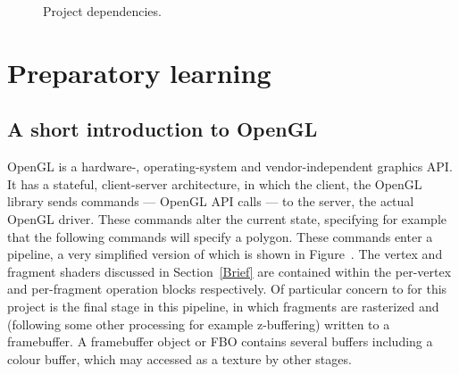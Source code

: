 \documentclass[12pt,twoside,notitlepage]{report}
\begin{document}
\begin{figure}
\caption{Project dependencies.\label{depend}}
\end{figure}

\section{Preparatory learning}
\subsection{A short introduction to OpenGL}
OpenGL is a hardware-, operating-system and vendor-independent graphics API. It has a stateful, client-server architecture, in which the client, the OpenGL library sends commands --- OpenGL API calls --- to the server, the actual OpenGL driver. These commands alter the current state, specifying for example that the following commands will specify a polygon. These commands enter a pipeline, a very simplified version of which is shown in Figure~\cite{opengl-pipe}. The vertex and fragment shaders discussed in Section~\ref{Brief} are contained within the per-vertex and per-fragment operation blocks respectively. Of particular concern to for this project is the final stage in this pipeline, in which fragments are rasterized and (following some other processing for example z-buffering) written to a framebuffer. A framebuffer object or FBO contains several buffers including a colour buffer, which may accessed as a texture by other stages.
\end{document}
